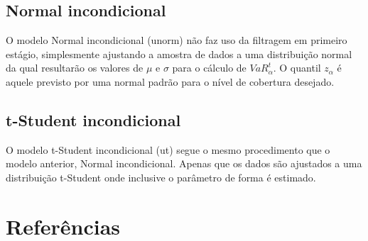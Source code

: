 \documentclass[1p]{elsarticle}
\theoremstyle{definition}
\begin{document}
\subsection{Normal incondicional}

O modelo Normal incondicional (unorm) não faz uso da filtragem em primeiro estágio, simplesmente ajustando a amostra de dados a uma distribuição normal da qual resultarão os valores de $\mu$ e $\sigma$ para o cálculo de $VaR^t_\alpha$. O quantil $z_\alpha$ é aquele previsto por uma normal padrão para o nível de cobertura desejado. 

\subsection{t-Student incondicional}

O modelo t-Student incondicional (ut) segue o mesmo procedimento que o modelo anterior, Normal incondicional. Apenas que os dados são ajustados a uma distribuição t-Student onde inclusive o parâmetro de forma é estimado.

\section*{Referências}


\end{document}
